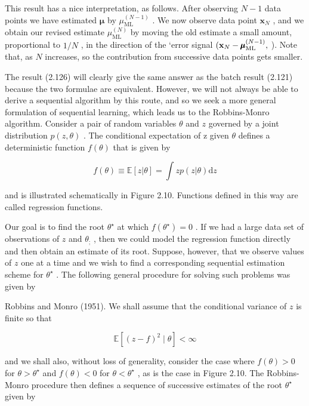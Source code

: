 \documentclass[
  10
]{article}
\begin{document}
This result has a nice interpretation, as follows. After observing
\(N - 1\) data points we have estimated \(\pmb { \mu }\) by
\(\mu _ { \mathrm { M L } } ^ { ( N - 1 ) }\) . We now observe data
point \(\mathbf { x } _ { N }\) , and we obtain our revised estimate
\(\mu _ { \mathrm { M L } } ^ { ( N ) }\) by moving the old estimate a
small amount, proportional to \(1 / N\) , in the direction of the `error
signal
\(( { \bf x } _ { N } - \pmb { \mu } _ { \mathrm { M L } } ^ { ( N - 1 ) } ,\)
). Note that, as \(N\) increases, so the contribution from successive
data points gets smaller.

The result (2.126) will clearly give the same answer as the batch result
(2.121) because the two formulae are equivalent. However, we will not
always be able to derive a sequential algorithm by this route, and so we
seek a more general formulation of sequential learning, which leads us
to the Robbins-Monro algorithm. Consider a pair of random variables
\(\theta\) and \(z\) governed by a joint distribution
\(p ( z , \theta )\) . The conditional expectation of z given \(\theta\)
defines a deterministic function \(f ( \theta )\) that is given by

\[
f (\theta) \equiv \mathbb {E} [ z | \theta ] = \int z p (z | \theta) \mathrm{d} z\tag{2.127}
\]

and is illustrated schematically in Figure 2.10. Functions defined in
this way are called regression functions.

Our goal is to find the root \(\theta ^ { \star }\) at which
\(f ( \theta ^ { \star } ) = 0\) . If we had a large data set of
observations of \(z\) and \(\theta _ { ; }\) , then we could model the
regression function directly and then obtain an estimate of its root.
Suppose, however, that we observe values of \(z\) one at a time and we
wish to find a corresponding sequential estimation scheme for
\(\theta ^ { \star }\) . The following general procedure for solving
such problems was given by

Robbins and Monro (1951). We shall assume that the conditional variance
of \(z\) is finite so that

\[
\mathbb {E} \left[ (z - f) ^ {2} \mid \theta \right] <   \infty\tag{2.128}
\]

and we shall also, without loss of generality, consider the case where
\(f ( \theta ) > 0\) for \(\theta > \theta ^ { \star }\) and
\(f ( \theta ) < 0\) for \(\theta < \theta ^ { \star }\) , as is the
case in Figure 2.10. The Robbins-Monro procedure then defines a sequence
of successive estimates of the root \(\theta ^ { \star }\) given by
\end{document}
